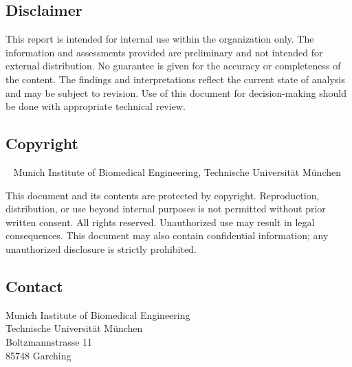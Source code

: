 \vfill %
\begingroup
	\footnotesize %
	\subsection*{Disclaimer}
		This report is intended for internal use within the organization only. The information and assessments provided are preliminary and not intended for external distribution. No guarantee is given for the accuracy or completeness of the content. The findings and interpretations reflect the current state of analysis and may be subject to revision. Use of this document for decision-making should be done with appropriate technical review.
	\subsection*{Copyright}
		\textcopyright~\the\year{} Munich Institute of Biomedical Engineering, Technische Universität München 
		
		This document and its contents are protected by copyright. Reproduction, distribution, or use beyond internal purposes is not permitted without prior written consent. All rights reserved. Unauthorized use may result in legal consequences. This document may also contain confidential information; any unauthorized disclosure is strictly prohibited.

	\subsection*{Contact}
		Munich Institute of Biomedical Engineering\\
		Technische Universität München\\
		Boltzmannstrasse 11\\
		85748 Garching\\
\endgroup
